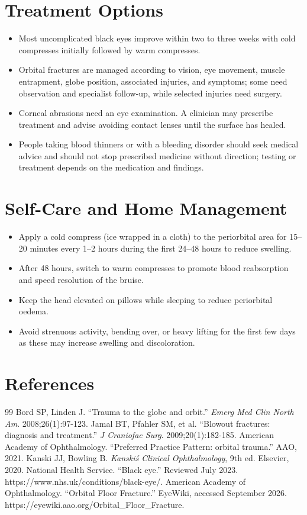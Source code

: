 \section*{Treatment Options}
\begin{itemize}
 \item Most uncomplicated black eyes improve within two to three weeks with cold compresses initially followed by warm compresses.
 \item Orbital fractures are managed according to vision, eye movement, muscle entrapment, globe position, associated injuries, and symptoms; some need observation and specialist follow-up, while selected injuries need surgery.
 \item Corneal abrasions need an eye examination. A clinician may prescribe treatment and advise avoiding contact lenses until the surface has healed.
 \item People taking blood thinners or with a bleeding disorder should seek medical advice and should not stop prescribed medicine without direction; testing or treatment depends on the medication and findings.
\end{itemize}

\section*{Self-Care and Home Management}
\begin{itemize}
 \item Apply a cold compress (ice wrapped in a cloth) to the periorbital area for 15–20 minutes every 1–2 hours during the first 24–48 hours to reduce swelling.
 \item After 48 hours, switch to warm compresses to promote blood reabsorption and speed resolution of the bruise.
 \item Keep the head elevated on pillows while sleeping to reduce periorbital oedema.
 \item Avoid strenuous activity, bending over, or heavy lifting for the first few days as these may increase swelling and discoloration.
\end{itemize}

\section*{References}
\begin{thebibliography}{99}
 Bord SP, Linden J. ``Trauma to the globe and orbit.'' \textit{Emerg Med Clin North Am}. 2008;26(1):97-123.
 Jamal BT, Pfahler SM, et al. ``Blowout fractures: diagnosis and treatment.'' \textit{J Craniofac Surg}. 2009;20(1):182-185.
 American Academy of Ophthalmology. ``Preferred Practice Pattern: orbital trauma.'' AAO, 2021.
 Kanski JJ, Bowling B. \textit{Kanski\'s Clinical Ophthalmology}, 9th ed. Elsevier, 2020.
 National Health Service. ``Black eye.'' Reviewed July 2023. https://www.nhs.uk/conditions/black-eye/.
 American Academy of Ophthalmology. ``Orbital Floor Fracture.'' EyeWiki, accessed September 2026. https://eyewiki.aao.org/Orbital\_Floor\_Fracture.
\end{thebibliography}
